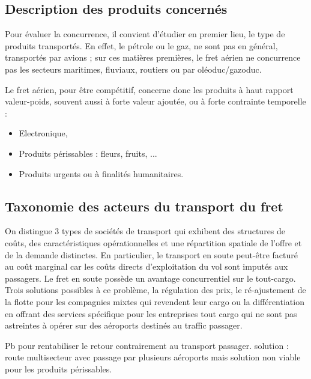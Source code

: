 \subsection{Description des produits concernés}
Pour évaluer la concurrence, il convient d'étudier en premier lieu, le type de produits transportés. En effet, le pétrole ou le gaz, ne sont pas en général, transportés par avions ; sur ces matières premières, le fret aérien ne concurrence pas les secteurs maritimes, fluviaux, routiers ou par oléoduc/gazoduc. 

Le fret aérien, pour être compétitif, concerne donc les produits à haut rapport valeur-poids, souvent aussi à forte valeur ajoutée, ou à forte contrainte temporelle :


\begin{itemize}
	\item Electronique,
	\item Produits périssables : fleurs, fruits, ...
	\item Produits urgents ou à finalités humanitaires.
\end{itemize}









\subsection{Taxonomie des acteurs du transport du fret}

On distingue 3 types de sociétés de transport qui exhibent des structures de coûts, des caractéristiques opérationnelles et une répartition spatiale de l'offre et de la demande distinctes. En particulier, le transport en soute peut-être facturé au coût marginal car les coûts directs d'exploitation du vol sont imputés aux passagers. Le fret en soute possède un avantage concurrentiel sur le tout-cargo. Trois solutions possibles à ce problème, la régulation des prix, le ré-ajustement de la flotte pour les compagnies mixtes qui revendent leur cargo ou la différentiation en offrant des services spécifique pour les entreprises tout cargo qui ne sont pas astreintes à opérer sur des aéroports destinés au traffic passager. 

Pb pour rentabiliser le retour contrairement au transport passager.
solution : route multisecteur avec passage par plusieurs aéroports
mais solution non viable pour les produits périssables.


